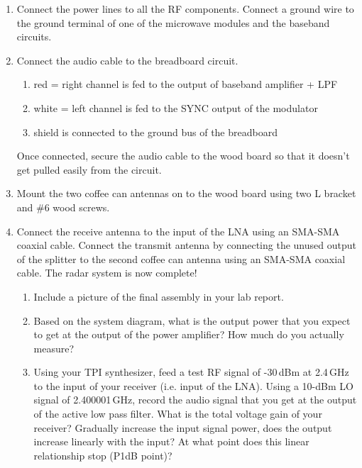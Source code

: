 \documentclass[letterpaper, 11pt]{article}
\begin{document}
\begin{enumerate}
	\item Connect the power lines to all the RF components. Connect a ground wire to the ground terminal of one of the microwave modules and the baseband circuits. 
	
	\item Connect the audio cable to the breadboard circuit.
		\begin{enumerate}
			\item red = right channel is fed to the output of baseband amplifier + LPF
			\item white = left channel is fed to the SYNC output of the modulator
			\item shield is connected to the ground bus of the breadboard
		\end{enumerate} 

	Once connected, secure the audio cable to the wood board so that it doesn't get pulled easily from the circuit. 
		
	\item Mount the two coffee can antennas on to the wood board using two L bracket and \#6 wood screws. 
	
	\item Connect the receive antenna to the input of the LNA using an SMA-SMA coaxial cable. Connect the transmit antenna by connecting the unused output of the splitter to the second coffee can antenna using an SMA-SMA coaxial cable. The radar system is now complete! 
		\begin{enumerate}
			\item Include a picture of the final assembly in your lab report.
			
			\item Based on the system diagram, what is the output power that you expect to get at the output of the power amplifier? How much do you actually measure?
			
			\item Using your TPI synthesizer, feed a test RF signal of -30\,dBm at 2.4\,GHz to the input of your receiver (i.e. input of the LNA). Using a 10-dBm LO signal of 2.400001\,GHz, record the audio signal that you get at the output of the active low pass filter. What is the total voltage gain of your receiver? Gradually increase the input signal power, does the output increase linearly with the input? At what point does this linear relationship stop (P1dB point)?
		\end{enumerate}
	
\end{enumerate}
\end{document}
